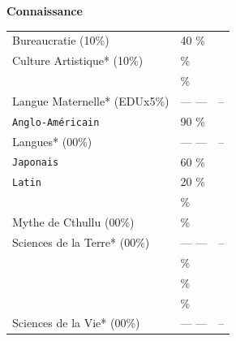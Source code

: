 \documentclass[11pt,twoside,a4paper]{article}
\begin{document}



\begin{multicols}{3}
	\textbf{Connaissance} \hrulefill ~\\  	%
	{\scriptsize \begin{tabular}[c]{ p{4.00cm} p{1.00cm}|c|}
		\cline{3-3}
		Bureaucratie (10\%)		& 40 \% & ~ \\ 		%
		\cline{3-3}
		Culture Artistique* (10\%)	& \dotfill \% & ~ \\
		\cline{3-3}
		\dotfill			& \dotfill \% & ~ \\
		\cline{3-3}
		Langue Maternelle* (EDUx5\%)	& --- ---     & -- \\
		\cline{3-3}
		\texttt{Anglo-Am{\'e}ricain} \dotfill & 90 \dotfill \% & ~ \\
		\cline{3-3}
		Langues* (00\%)			& --- ---     & -- \\
		\cline{3-3}
		\texttt{Japonais} \dotfill	& 60 \% & ~ \\		%
		\cline{3-3}
		\texttt{Latin} \dotfill		& 20 \% & ~ \\		%
		\cline{3-3}
		\dotfill			& \dotfill \% & ~ \\
		\cline{3-3}
		Mythe de Cthullu (00\%)		& \dotfill \% & ~ \\
		\cline{3-3}
		Sciences de la Terre* (00\%)	& --- ---     & -- \\
		\cline{3-3}
		\dotfill			& \dotfill \% & ~ \\
		\cline{3-3}
		\dotfill			& \dotfill \% & ~ \\
		\cline{3-3}
		\dotfill			& \dotfill \% & ~ \\
		\cline{3-3}
		Sciences de la Vie* (00\%)	& --- ---     & -- \\

\end{tabular}}
\end{multicols}
\end{document}
